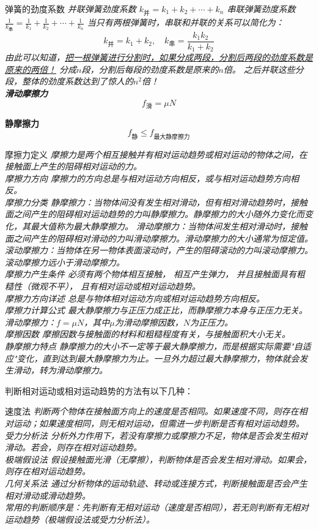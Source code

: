 \documentclass[a4paper, 12pt]{article}
\newcommand{\defitem}[2]{
\noindent \textsf{#1} \hspace{1em} \itshape{#2} \\
}
\newcommand{\formula}[2]{
  \noindent \textbf{#2} \\ \[ #1 \]
}
\newcommand{\noticebox}[1]{
  \begin{arcbox}
    \normalfont #1
  \end{arcbox}
}
\begin{document}
\defitem{弹簧的劲度系数}{
  并联弹簧劲度系数 $k_\text{并} = k_1 + k_2 + \cdots + k_n$
  串联弹簧劲度系数 $\frac1{k_\text{串}} = \frac{1}{k_1} + \frac{1}{k_2} + \cdots + \frac{1}{k_n}$
  当只有两根弹簧时，串联和并联的关系可以简化为：
  \[
    k_\text{并} = k_1 + k_2, \quad k_\text{串} = \frac{k_1 k_2}{k_1 + k_2}
  \]
  由此可以知道，\underline{把一根弹簧进行分割时，如果分成两段，分割后两段的劲度系数是原来的两倍！}
  分成$n$段，分割后每段的劲度系数是原来的$n$倍。
  之后并联这些分段，整体的劲度系数达到了惊人的$n^2$倍！
}
\formula{f_{\text{滑}} = \mu N}{滑动摩擦力}
\formula{f_{\text{静}} \leq  f_{\text{最大静摩擦力}}}{静摩擦力}

\defitem{摩擦力定义}{摩擦力是两个\emph{相互接触}并有\emph{相对运动趋势或相对运动}的物体之间，在接触面上产生的阻碍相对运动的力。}

\defitem{摩擦力方向}{摩擦力的方向总是与相对运动方向相反，或与相对运动趋势方向相反。}

\defitem{摩擦力分类}{
  \emph{静摩擦力}：当物体间没有发生相对滑动，但有相对滑动趋势时，接触面之间产生的阻碍相对运动趋势的力叫静摩擦力。静摩擦力的大小随外力变化而变化，其最大值称为最大静摩擦力。
  \emph{滑动摩擦力}：当物体间发生相对滑动时，接触面之间产生的阻碍相对滑动的力叫滑动摩擦力。滑动摩擦力的大小通常为恒定值。
  \emph{滚动摩擦力}：当物体在另一物体表面滚动时，产生的阻碍滚动的力叫滚动摩擦力。滚动摩擦力远小于滑动摩擦力。
}

\defitem{摩擦力产生条件}{必须有两个物体相互接触，
  相互产生弹力，
  并且接触面具有粗糙性（微观不平），
且有相对运动或相对运动趋势。}

\defitem{摩擦力方向详述}{总是与物体相对运动方向或相对运动趋势方向相反。}

\defitem{摩擦力计算公式}{最大静摩擦力与正压力成正比，而静摩擦力本身与正压力无关。滑动摩擦力：$f = \mu N$，其中$\mu$为滑动摩擦因数，$N$为正压力。}

\defitem{摩擦因数}{摩擦因数与接触面的材料和粗糙程度有关，与接触面积大小无关。}

\defitem{静摩擦力特点}{静摩擦力的大小不一定等于最大静摩擦力，而是根据实际需要"自适应"变化，直到达到最大静摩擦力为止。一旦外力超过最大静摩擦力，物体就会发生滑动，转为滑动摩擦力。}

\noticebox{
  判断相对运动或相对运动趋势的方法有以下几种：
  \defitem{速度法}{判断两个物体在接触面方向上的速度是否相同。如果速度不同，则存在相对运动；如果速度相同，则无相对运动，但需进一步判断是否有相对运动趋势。}
  \defitem{受力分析法}{分析外力作用下，若没有摩擦力或摩擦力不足，物体是否会发生相对滑动。若会，则存在相对运动趋势。}
  \defitem{极端假设法}{假设接触面光滑（无摩擦），判断物体是否会发生相对滑动。如果会，则存在相对运动趋势。}
  \defitem{几何关系法}{通过分析物体的运动轨迹、转动或连接方式，判断接触面是否会产生相对滑动或滑动趋势。}
  常用的判断顺序是：先判断有无相对运动（速度是否相同），若无则判断有无相对运动趋势（极端假设法或受力分析法）。
}
\end{document}
